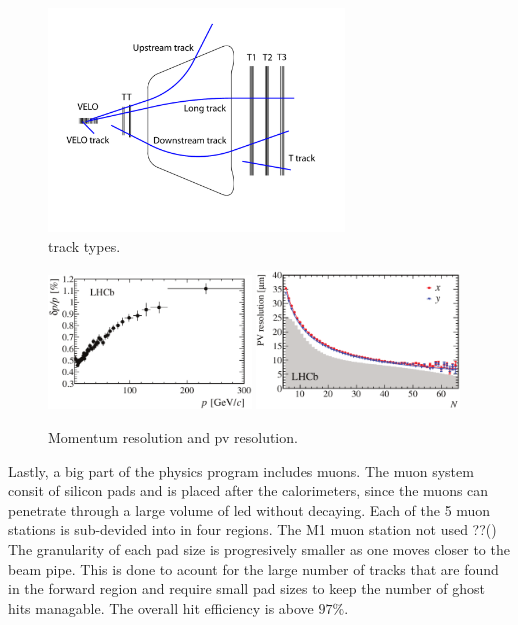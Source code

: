 \begin{figure}[t]
  \centering
  \includegraphics[width=0.7\textwidth]{Figures/Chapter2/trackTypesRunIAndII}
  \caption{\lhcb track types.}
  \label{track_types}
\end{figure}

\begin{figure}[t]
  \centering
  \includegraphics[width=0.48\textwidth]{Figures/Chapter2/dppVsp-crop-cmyk}
  \includegraphics[width=0.48\textwidth]{Figures/Chapter2/DataResXY_1PV_2012-crop-cmyk.pdf}
  \caption{\lhcb Momentum resolution and pv resolution.}
  \label{det_deltappvp}
\end{figure}

Lastly, a big part of the \lhcb physics program includes muons. The muon system consit of silicon pads and is placed after
the calorimeters, since the muons can penetrate through a large volume of led without decaying.
Each of the 5 muon stations is sub-devided into in four regions. {\color{red} The M1 muon station not used ??()}
The granularity of each pad size is progresively smaller as one moves closer to the beam pipe. This is done to acount
for the large number of tracks that are found in the forward region and require small pad sizes to keep the number
of ghost hits managable. The overall hit efficiency is above $97\%$.
